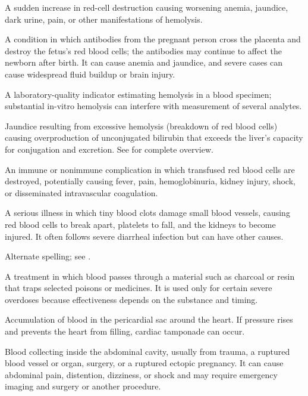  A sudden increase in red-cell destruction causing worsening anemia, jaundice, dark urine, pain, or other manifestations of hemolysis.

 A condition in which antibodies from the pregnant person cross the placenta and destroy the fetus’s red blood cells; the antibodies may continue to affect the newborn after birth. It can cause anemia and jaundice, and severe cases can cause widespread fluid buildup or brain injury.

 A laboratory-quality indicator estimating hemolysis in a blood specimen; substantial in-vitro hemolysis can interfere with measurement of several analytes.

 Jaundice resulting from excessive hemolysis (breakdown of red blood cells) causing
overproduction of unconjugated bilirubin that exceeds the liver's capacity for
conjugation and excretion. See  for complete overview.

 An immune or nonimmune complication in which transfused red blood cells are destroyed, potentially causing fever, pain, hemoglobinuria, kidney injury, shock, or disseminated intravascular coagulation.

 A serious illness in which tiny blood clots damage small blood vessels, causing red blood cells to break apart, platelets to fall, and the kidneys to become injured. It often follows severe diarrheal infection but can have other causes.

 Alternate spelling; see .

 A treatment in which blood passes through a material such as charcoal or resin that traps selected poisons or medicines. It is used only for certain severe overdoses because effectiveness depends on the substance and timing.

 Accumulation of blood in the pericardial sac around the heart. If pressure rises and prevents the heart from filling, cardiac tamponade can occur.

 Blood collecting inside the abdominal cavity, usually from trauma, a ruptured blood vessel or organ, surgery, or a ruptured ectopic pregnancy. It can cause abdominal pain, distention, dizziness, or shock and may require emergency imaging and surgery or another procedure.

